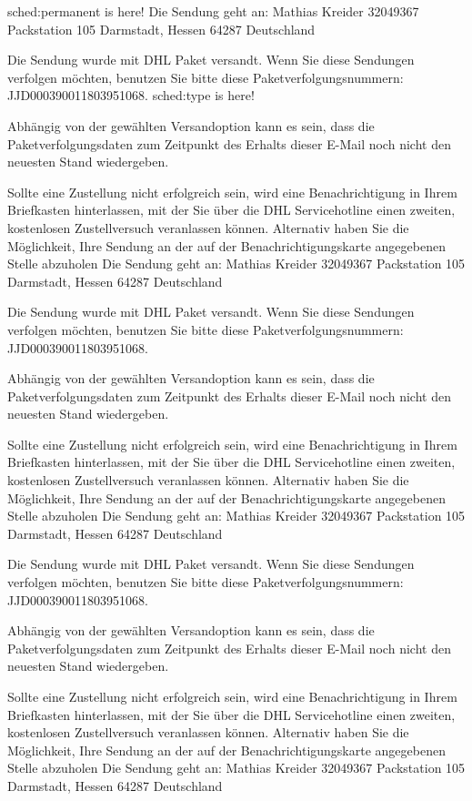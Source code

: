 \documentclass{report}
\begin{document}
\gls{sched:permanent} is here!
    Die Sendung geht an:   Mathias Kreider
   32049367
   Packstation 105
   Darmstadt, 
   Hessen 
   64287
   Deutschland

Die Sendung wurde mit DHL Paket versandt. Wenn Sie diese Sendungen verfolgen möchten, benutzen Sie bitte diese Paketverfolgungsnummern: JJD000390011803951068.
\gls{sched:type} is here!

Abhängig von der gewählten Versandoption kann es sein, dass die Paketverfolgungsdaten zum Zeitpunkt des Erhalts dieser E-Mail noch nicht den neuesten Stand wiedergeben.

Sollte eine Zustellung nicht erfolgreich sein, wird eine Benachrichtigung in Ihrem Briefkasten hinterlassen, mit der Sie über die DHL Servicehotline einen zweiten, kostenlosen Zustellversuch veranlassen können. Alternativ haben Sie die Möglichkeit, Ihre Sendung an der auf der Benachrichtigungskarte angegebenen Stelle abzuholen
Die Sendung geht an:   Mathias Kreider
   32049367
   Packstation 105
   Darmstadt, 
   Hessen 
   64287
   Deutschland

Die Sendung wurde mit DHL Paket versandt. Wenn Sie diese Sendungen verfolgen möchten, benutzen Sie bitte diese Paketverfolgungsnummern: JJD000390011803951068.


Abhängig von der gewählten Versandoption kann es sein, dass die Paketverfolgungsdaten zum Zeitpunkt des Erhalts dieser E-Mail noch nicht den neuesten Stand wiedergeben.

Sollte eine Zustellung nicht erfolgreich sein, wird eine Benachrichtigung in Ihrem Briefkasten hinterlassen, mit der Sie über die DHL Servicehotline einen zweiten, kostenlosen Zustellversuch veranlassen können. Alternativ haben Sie die Möglichkeit, Ihre Sendung an der auf der Benachrichtigungskarte angegebenen Stelle abzuholen
Die Sendung geht an:   Mathias Kreider
   32049367
   Packstation 105
   Darmstadt, 
   Hessen 
   64287
   Deutschland

Die Sendung wurde mit DHL Paket versandt. Wenn Sie diese Sendungen verfolgen möchten, benutzen Sie bitte diese Paketverfolgungsnummern: JJD000390011803951068.
   

Abhängig von der gewählten Versandoption kann es sein, dass die Paketverfolgungsdaten zum Zeitpunkt des Erhalts dieser E-Mail noch nicht den neuesten Stand wiedergeben.

Sollte eine Zustellung nicht erfolgreich sein, wird eine Benachrichtigung in Ihrem Briefkasten hinterlassen, mit der Sie über die DHL Servicehotline einen zweiten, kostenlosen Zustellversuch veranlassen können. Alternativ haben Sie die Möglichkeit, Ihre Sendung an der auf der Benachrichtigungskarte angegebenen Stelle abzuholen
Die Sendung geht an:   Mathias Kreider
   32049367
   Packstation 105
   Darmstadt, 
   Hessen 
   64287
   Deutschland
\end{document}
